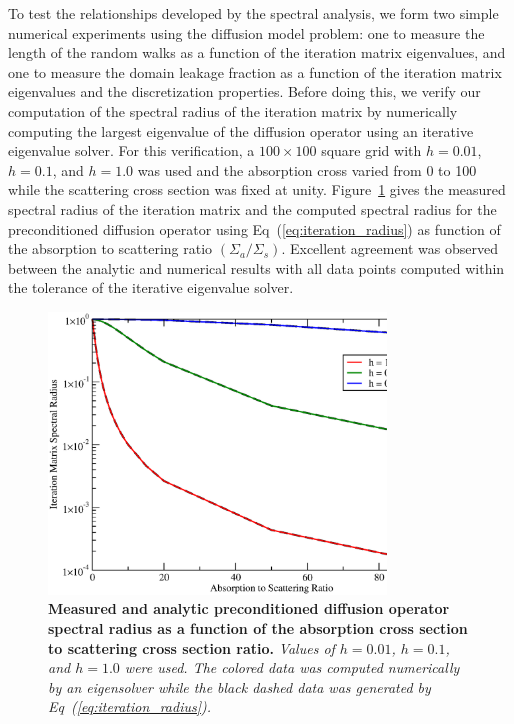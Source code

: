 \documentclass[preprint,11pt]{elsarticle}
\begin{document}
To test the relationships developed by the spectral analysis, we form two
simple numerical experiments using the diffusion model problem: one to measure
the length of the random walks as a function of the iteration matrix
eigenvalues, and one to measure the domain leakage fraction as a function of
the iteration matrix eigenvalues and the discretization properties. Before
doing this, we verify our computation of the spectral radius of the iteration
matrix by numerically computing the largest eigenvalue of the diffusion
operator using an iterative eigenvalue solver. For this verification, a $100
\times 100$ square grid with $h=0.01$, $h=0.1$, and $h=1.0$ was used and the
absorption cross varied from 0 to 100 while the scattering cross section was
fixed at unity. Figure~\ref{fig:measured_spec_rad} gives the measured spectral
radius of the iteration matrix and the computed spectral radius for the
preconditioned diffusion operator using Eq~(\ref{eq:iteration_radius}) as
function of the absorption to scattering ratio $(\Sigma_a /
\Sigma_s)$. Excellent agreement was observed between the analytic and
numerical results with all data points computed within the tolerance of the
iterative eigenvalue solver.
\begin{figure}[ht!]
  \begin{center}
    \includegraphics[width=0.8\textwidth]{spec_rad_results.eps}
  \end{center}
  \caption{\textbf{Measured and analytic preconditioned diffusion operator
      spectral radius as a function of the absorption cross section to
      scattering cross section ratio.} \textit{Values of $h=0.01$, $h=0.1$,
      and $h=1.0$ were used. The colored data was computed numerically by an
      eigensolver while the black dashed data was generated by
      Eq~(\ref{eq:iteration_radius}).}}
  \label{fig:measured_spec_rad}
\end{figure}
\end{document}
